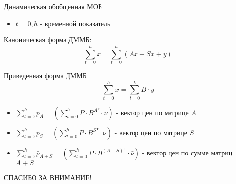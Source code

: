 \documentclass[serif,10pt,utf8, russian]{beamer}
\begin{document}
\begin{frame}{Динамическая обобщенная МОБ}
\begin{itemize}
\item $t=\overline{0,h}$ - временной показатель
\end{itemize}
\pause
\begin{block}{Каноническая форма ДММБ:}
\pause
\begin{equation}
\sum\limits_{t=0}^h{\bar x}=\sum\limits_{t=0}^h{\left( A\bar x + S\bar x + \bar y\right)}
\end{equation}
\end{block}
\pause
\begin{block}{Приведенная форма ДММБ}
\pause
\begin{equation}
\sum\limits_{t=0}^h{\bar x}=\sum\limits_{t=0}^h{B\cdot\bar y}
\end{equation}
\end{block}
\pause
\begin{itemize}
\item$\sum\limits_{t=0}^h{\bar{p}_A}=\left(\sum\limits_{t=0}^h{P\cdot{{B}^A}^\text{т}\cdot\bar\nu} \right)$ - вектор цен по матрице $A$
\pause
\item$\sum\limits_{t=0}^h{\bar{p}_S}=\left(\sum\limits_{t=0}^h{P\cdot{{B}^S}^\text{т}\cdot\bar\nu} \right)$ - вектор цен по матрице $S$
\pause
\item$\sum\limits_{t=0}^h{\bar{p}_{A+S}}=\left(\sum\limits_{t=0}^h{P\cdot{{B}^{\left( A+S\right)}}^\text{т}\cdot\bar\nu} \right)$ - вектор цен по сумме матриц $A+S$
\end{itemize}
\end{frame}

\begin{frame}
\begin{center}
\par{\large СПАСИБО ЗА ВНИМАНИЕ!}
\end{center}
\end{frame}
\end{document}
